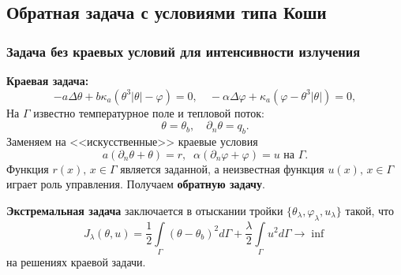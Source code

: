 \subsection{Обратная задача с условиями типа Коши}\label{subsec:rev_koshi}
\begin{frame}
    \frametitle{Задача без краевых условий для интенсивности излучения}
    \textbf{Краевая задача:}
    \begin{equation}
        \label{eq:2_2:eq1}
        - a \Delta \theta + b \kappa_a(\theta ^ 3 | \theta | - \varphi) = 0,  \quad
        - \alpha \Delta \varphi + \kappa_a (\varphi - \theta ^3 | \theta |) = 0,
    \end{equation}
    На $\Gamma$ известно температурное поле и тепловой поток:
    \begin{equation}
        \label{eq:2_2:bc2} \theta = \theta_b, \quad \partial_n\theta = q_b.
    \end{equation}
    Заменяем на <<искусственные>> краевые условия
    \begin{equation}
        \label{eq:2_2:bc3}
        a(\partial_n\theta+\theta) = r,\;\;
        \alpha(\partial_n\varphi+\varphi) = u \text{ на }\Gamma.
    \end{equation}
    Функция $r(x),\, x\in\Gamma$ является заданной, а неизвестная функция $u(x),\, x\in\Gamma$
    играет роль управления. Получаем \textbf{обратную задачу}.

    \textbf{Экстремальная задача} заключается в отыскании тройки
    $\{\theta_\lambda,\varphi_\lambda,u_\lambda\}$ такой, что
    \begin{equation}
        \label{eq:2_2:cost}
        J_\lambda(\theta, u) = \frac{1}{2}\int\limits_\Gamma (\theta - \theta_b)^2 d\Gamma
        + \frac{\lambda}{2}\int\limits_\Gamma u^2 d\Gamma \rightarrow\inf
    \end{equation}
    на решениях краевой задачи.
\end{frame}

